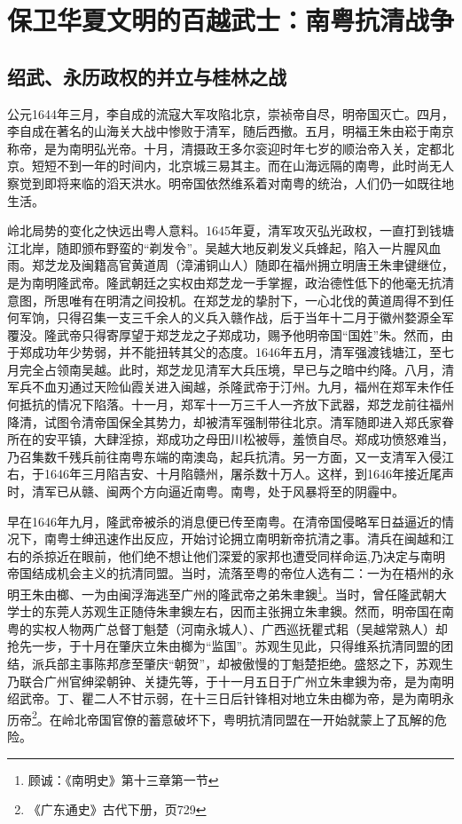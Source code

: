 \chapter{保卫华夏文明的百越武士：南粤抗清战争}

\section{绍武、永历政权的并立与桂林之战}


\indent 公元1644年三月，李自成的流寇大军攻陷北京，崇祯帝自尽，明帝国灭亡。四月，李自成在著名的山海关大战中惨败于清军，随后西撤。五月，明福王朱由崧于南京称帝，是为南明弘光帝。十月，清摄政王多尔衮迎时年七岁的顺治帝入关，定都北京。短短不到一年的时间内，北京城三易其主。而在山海远隔的南粤，此时尚无人察觉到即将来临的滔天洪水。明帝国依然维系着对南粤的统治，人们仍一如既往地生活。

岭北局势的变化之快远出粤人意料。1645年夏，清军攻灭弘光政权，一直打到钱塘江北岸，随即颁布野蛮的“剃发令”。吴越大地反剃发义兵蜂起，陷入一片腥风血雨。郑芝龙及闽籍高官黄道周（漳浦铜山人）随即在福州拥立明唐王朱聿键继位，是为南明隆武帝。隆武朝廷之实权由郑芝龙一手掌握，政治德性低下的他毫无抗清意图，所思唯有在明清之间投机。在郑芝龙的挚肘下，一心北伐的黄道周得不到任何军饷，只得召集一支三千余人的义兵入赣作战，后于当年十二月于徽州婺源全军覆没。隆武帝只得寄厚望于郑芝龙之子郑成功，赐予他明帝国“国姓”朱。然而，由于郑成功年少势弱，并不能扭转其父的态度。1646年五月，清军强渡钱塘江，至七月完全占领南吴越。此时，郑芝龙见清军大兵压境，早已与之暗中约降。八月，清军兵不血刃通过天险仙霞关进入闽越，杀隆武帝于汀州。九月，福州在郑军未作任何抵抗的情况下陷落。十一月，郑军十一万三千人一齐放下武器，郑芝龙前往福州降清，试图令清帝国保全其势力，却被清军强制带往北京。清军随即进入郑氏家眷所在的安平镇，大肆淫掠，郑成功之母田川松被辱，羞愤自尽。郑成功愤怒难当，乃召集数千残兵前往南粤东端的南澳岛，起兵抗清。另一方面，又一支清军入侵江右，于1646年三月陷吉安、十月陷赣州，屠杀数十万人。这样，到1646年接近尾声时，清军已从赣、闽两个方向逼近南粤。南粤，处于风暴将至的阴霾中。

早在1646年九月，隆武帝被杀的消息便已传至南粤。在清帝国侵略军日益逼近的情况下，南粤士绅迅速作出反应，开始讨论拥立南明新帝抗清之事。清兵在闽越和江右的杀掠近在眼前，他们绝不想让他们深爱的家邦也遭受同样命运,乃决定与南明帝国结成机会主义的抗清同盟。当时，流落至粤的帝位人选有二：一为在梧州的永明王朱由榔、一为由闽浮海逃至广州的隆武帝之弟朱聿鐭\footnote{顾诚：《南明史》第十三章第一节}。当时，曾任隆武朝大学士的东莞人苏观生正随侍朱聿鐭左右，因而主张拥立朱聿鐭。然而，明帝国在南粤的实权人物两广总督丁魁楚（河南永城人）、广西巡抚瞿式耜（吴越常熟人）却抢先一步，于十月在肇庆立朱由榔为“监国”。苏观生见此，只得维系抗清同盟的团结，派兵部主事陈邦彦至肇庆“朝贺”，却被傲慢的丁魁楚拒绝。盛怒之下，苏观生乃联合广州官绅梁朝钟、关捷先等，于十一月五日于广州立朱聿鐭为帝，是为南明绍武帝。丁、瞿二人不甘示弱，在十三日后针锋相对地立朱由榔为帝，是为南明永历帝\footnote{《广东通史》古代下册，页729}。在岭北帝国官僚的蓄意破坏下，粤明抗清同盟在一开始就蒙上了瓦解的危险。

